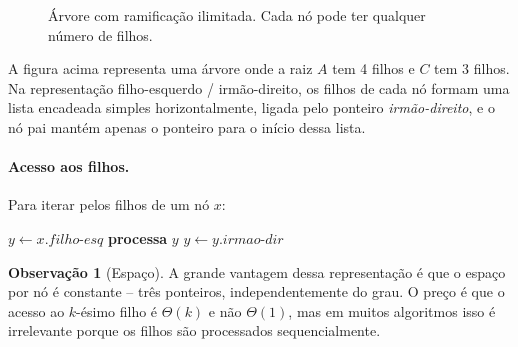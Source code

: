 \documentclass[9pt,a4paper]{extarticle}
\newcommand{\impt}[1]{\textcolor{important}{#1}}
\theoremstyle{definition}
\newtheorem{remark}{Observação}[section]
\begin{document}
\begin{figure}[h]
\centering
{}
\caption{Árvore com ramificação ilimitada. Cada nó pode ter qualquer número de filhos.}
\end{figure}

A figura acima representa uma árvore onde a raiz $A$ tem 4 filhos e $C$ tem 3 filhos. Na representação filho-esquerdo / irmão-direito, os filhos de cada nó formam uma \impt{lista encadeada simples horizontalmente}, ligada pelo ponteiro \emph{irmão-direito}, e o nó pai mantém apenas o ponteiro para o início dessa lista.

\paragraph{Acesso aos filhos.} Para iterar pelos filhos de um nó $x$:
\begin{algorithm}[H]
\caption{\textsc{Percorre-Filhos}($x$)}
\begin{algorithmic}[1]
\State $y \gets x.\mathit{filho\text{-}esq}$
    \State \textbf{processa} $y$
    \State $y \gets y.\mathit{irmao\text{-}dir}$
\EndWhile
\end{algorithmic}
\end{algorithm}

\begin{remark}[Espaço]
A grande vantagem dessa representação é que o espaço por nó é \impt{constante} -- três ponteiros, independentemente do grau. O preço é que o acesso ao $k$-ésimo filho é $\Theta(k)$ e não $\Theta(1)$, mas em muitos algoritmos isso é irrelevante porque os filhos são processados sequencialmente.
\end{remark}
\end{document}
